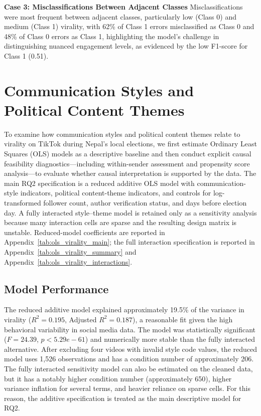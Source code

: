 \documentclass[12pt,a4paper]{report}
\begin{document}
\textbf{Case 3: Misclassifications Between Adjacent Classes}
Misclassifications were most frequent between adjacent classes, particularly low (Class 0) and medium (Class 1) virality, with 62\% of Class 1 errors misclassified as Class 0 and 48\% of Class 0 errors as Class 1, highlighting the model’s challenge in distinguishing nuanced engagement levels, as evidenced by the low F1-score for Class 1 (0.51).
\newpage
\section{Communication Styles and Political Content Themes}
To examine how communication styles and political content themes relate to virality on TikTok during Nepal’s local elections, we first estimate Ordinary Least Squares (OLS) models as a descriptive baseline and then conduct explicit
causal feasibility diagnostics—including within-sender assessment and propensity score analysis—to evaluate whether causal interpretation is supported by the data. The main RQ2 specification is a reduced additive OLS model with communication-style indicators, political content-theme indicators, and controls for log-transformed follower count, author verification status, and days before election day. A fully interacted style--theme model is retained only as a sensitivity analysis because many interaction cells are sparse and the resulting design matrix is unstable. Reduced-model coefficients are reported in Appendix~\ref{tab:ols_virality_main}; the full interaction specification is reported in Appendix~\ref{tab:ols_virality_summary} and Appendix~\ref{tab:ols_virality_interactions}.

\subsection{Model Performance}
The reduced additive model explained approximately 19.5\% of the variance in virality (\( R^2 = 0.195 \), Adjusted \( R^2 = 0.187 \)), a reasonable fit given the high behavioral variability in social media data. The model was statistically significant (\( F = 24.39 \), \( p < 5.29e-61 \)) and numerically more stable than the fully interacted alternative. After excluding four videos with invalid style code values, the reduced model uses 1,526 observations and has a condition number of approximately 206. The fully interacted sensitivity model can also be estimated on the cleaned data, but it has a notably higher condition number (approximately 650), higher variance inflation for several terms, and heavier reliance on sparse cells. For this reason, the additive specification is treated as the main descriptive model for RQ2.
\end{document}
